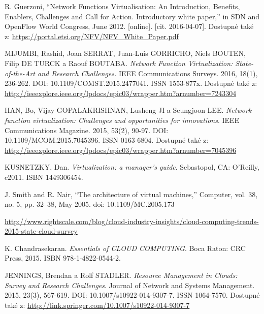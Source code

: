 
 \renewcommand{\appendixname}{Literatura}%

  
\begin{thebibliography}{10}

R. Guerzoni, “Network Functions Virtualisation: An Introduction, Benefits, Enablers, Challenges and Call for Action. Introductory white paper,” in SDN and OpenFlow World Congress, June 2012. [online]. [cit. 2016-04-07]. Dostupné také z: \url{https://portal.etsi.org/NFV/NFV_White_Paper.pdf}


MIJUMBI, Rashid, Joan SERRAT, Juan-Luis GORRICHO, Niels BOUTEN, Filip DE TURCK a Raouf BOUTABA. \emph{Network Function Virtualization: State-of-the-Art and Research Challenges.} IEEE Communications Surveys. 2016, 18(1), 236-262. DOI: 10.1109/COMST.2015.2477041. ISSN 1553-877x. Dostupné také z: \url{http://ieeexplore.ieee.org/lpdocs/epic03/wrapper.htm?arnumber=7243304}

HAN, Bo, Vijay GOPALAKRISHNAN, Lusheng JI a Seungjoon LEE. \emph{Network function virtualization: Challenges and opportunities for innovations}. IEEE Communications Magazine. 2015, 53(2), 90-97. DOI: 10.1109/MCOM.2015.7045396. ISSN 0163-6804. Dostupné také z: \url{http://ieeexplore.ieee.org/lpdocs/epic03/wrapper.htm?arnumber=7045396}

KUSNETZKY, Dan. \emph{Virtualization: a manager's guide}. Sebastopol, CA: O'Reilly, c2011. ISBN 1449306454.

J. Smith and R. Nair, “The architecture of virtual machines,” Computer, vol. 38, no. 5, pp. 32–38, May 2005. doi: 10.1109/MC.2005.173

\url{http://www.rightscale.com/blog/cloud-industry-insights/cloud-computing-trends-2015-state-cloud-survey}

K. Chandrasekaran. \emph{Essentials of CLOUD COMPUTING}. Boca Raton: CRC Press, 2015. ISBN 978-1-4822-0544-2.

JENNINGS, Brendan a Rolf STADLER. \emph{Resource Management in Clouds: Survey and Research Challenges}. Journal of Network and Systems Management. 2015, 23(3), 567-619. DOI: 10.1007/s10922-014-9307-7. ISSN 1064-7570. Dostupné také z: \url{http://link.springer.com/10.1007/s10922-014-9307-7}


\end{thebibliography}
